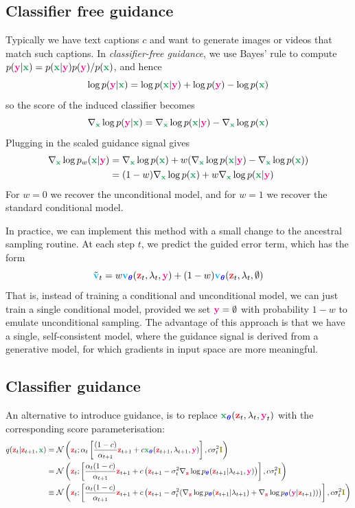 \documentclass[usenames,dvipsnames]{article}
\newcommand{\myvec}[1]{\mathbf{#1}}
\newcommand{\myvecsym}[1]{\boldsymbol{#1}}
\newcommand{\vx}{\myvec{\textcolor{ForestGreen}{x}}}
\newcommand{\vz}{\myvec{\textcolor{Red}{z}}}
\newcommand{\vy}{\myvec{\textcolor{Magenta}{y}}}
\newcommand{\vv}{\myvec{\textcolor{Cyan}{v}}}
\newcommand{\vI}{\myvec{\textcolor{olive}{I}}}
\newcommand{\vtheta}{\myvecsym{\textcolor{blue}{\theta}}}
\newcommand{\vepsilon}{\myvecsym{\textcolor{CarnationPink}{\epsilon}}}
\newcommand{\pT}{p_{\vtheta}}
\newcommand{\be}{\begin{equation}}
\newcommand{\ee}{\end{equation}}
\begin{document}
\subsection{Classifier free guidance}
Typically we have text captions $c$ and want to generate images or videos that match such captions. In \emph{classifier-free guidance}, we use Bayes' rule to compute
$p(\vy|\vx) =  p(\vx|\vy) p(\vy)/ p(\vx)$,
and hence
\be
\log p(\vy|\vx) = \log p(\vx|\vy)  + \log p(\vy) - \log p(\vx)
\ee
so the score of the induced classifier becomes
\be
\nabla_{\vx} \log p(\vy|\vx) = \nabla_{\vx} \log p(\vx|\vy)  - \nabla_{\vx} \log p(\vx)
\ee
Plugging in the scaled guidance signal gives
\begin{align}
\nabla_{\vx} \log p_{w}(\vx|\vy)
&= \nabla_{\vx} \log p(\vx)  + w(\nabla_{\vx} \log p(\vx|\vy)  - \nabla_{\vx} \log p(\vx)) \\
&= (1-w) \nabla_{\vx} \log p(\vx)  + w \nabla_{\vx} \log p(\vx|\vy)
\end{align}
For $w=0$ we recover the unconditional model, and for $w=1$ we recover
the standard conditional model.

In practice, we can implement this method with a small change
to the ancestral sampling routine.
At each step $t$, we predict the guided error term,
which has the form
\be
\tilde{\vv}_t  = w \vv_{\vtheta}(\vz_t,\lambda_t,\vy)
+ (1-w) \vv_{\vtheta}(\vz_t,\lambda_t,\emptyset)
\ee
That is, instead of training a conditional and unconditional model,
 we can just train a single conditional model,
provided we  set $\vy=\emptyset$ with probability $1-w$ to emulate unconditional sampling.
The advantage of this approach is that we have a single, self-consistent model,
where the guidance signal is derived from a generative model,
for which gradients in input space are more meaningful.


\subsection{Classifier guidance}

An alternative to introduce guidance, is to replace $\vx_{\vtheta}(\vz_t,\lambda_t, \vy_t)$ with the corresponding score parameterisation:
\begin{align}
q(\vz_{t}|\vz_{t+1}, \vx) &=
\mathcal{N}\left(\vz_{t};  
\alpha_{t} \left[
\frac{(1-c)}{\alpha_{t+1}}
\vz_{t+1}
+ c \vx_{\vtheta}(\vz_{t+1},\lambda_{t+1},\vy)\right],
c \sigma_{t}^2
\vI\right) \nonumber \\
&=
\mathcal{N}\left(\vz_{t};  
\left[
\frac{\alpha_{t} (1-c)}{\alpha_{t+1}}
\vz_{t+1}
+ c  \left( \vz_{t+1} - \sigma_t^2  \nabla_\vz \log \pT(\vz_{t+1}|\lambda_{t+1},\vy)  \right)\right],
c \sigma_{t}^2
\vI\right) \nonumber \\
& \equiv
\mathcal{N}\left(\vz_{t};  
\left[
\frac{\alpha_{t} (1-c)}{\alpha_{t+1}}
\vz_{t+1}
+ c  \left( \vz_{t+1} - \sigma_t^2 ( \nabla_\vz \log \pT(\vz_{t+1}|\lambda_{t+1}) + \nabla_\vz \log \pT(\vy | \vz_{t+1} ) ) \right)\right],
c \sigma_{t}^2
\vI\right) \nonumber
\end{align}
\end{document}
